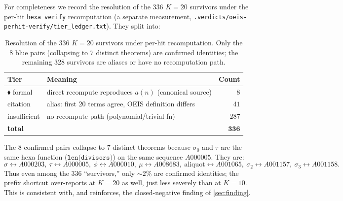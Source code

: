 \documentclass[11pt,a4paper]{article}
\newcommand{\sig}{\sigma}
\newcommand{\Ktwenty}{K\!=\!20}
\theoremstyle{definition}
\begin{document}
For completeness we record the resolution of the $336$ $\Ktwenty$ survivors
under the per-hit \texttt{hexa verify} recomputation (a separate measurement,
\texttt{.verdicts/oeis-perhit-verify/tier\_ledger.txt}). They split into:

\begin{table}[h]
\centering
\caption{Resolution of the $336$ $\Ktwenty$ survivors under per-hit
recomputation. Only the $8$ blue pairs (collapsing to $7$ distinct theorems)
are confirmed identities; the remaining $328$ survivors are aliases or have no
recomputation path.}
\label{tab:survivors}
\begin{tabular}{@{}llr@{}}
\toprule
\textbf{Tier} & \textbf{Meaning} & \textbf{Count}\\
\midrule
$\blacklozenge$ formal & direct recompute reproduces $a(n)$ (canonical source) & $8$\\
citation               & alias: first $20$ terms agree, OEIS definition differs & $41$\\
insufficient           & no recompute path (polynomial/trivial fn)              & $287$\\
\midrule
\textbf{total}         &                                                        & $\mathbf{336}$\\
\bottomrule
\end{tabular}
\end{table}

The $8$ confirmed pairs collapse to $7$ distinct theorems because $\sig_0$ and
$\tau$ are the same hexa function ($\texttt{len(divisors)}$) on the same
sequence $A000005$. They are:
\[
  \sig\!\leftrightarrow\!A000203,\
  \tau\!\leftrightarrow\!A000005,\
  \phi\!\leftrightarrow\!A000010,\
  \mu\!\leftrightarrow\!A008683,\
  \text{aliquot}\!\leftrightarrow\!A001065,\
  \sig_2\!\leftrightarrow\!A001157,\
  \sig_3\!\leftrightarrow\!A001158.
\]
Thus even among the $336$ ``survivors,'' only $\sim\!2\%$ are confirmed
identities; the prefix shortcut over-reports at $K=20$ as well, just less
severely than at $K=10$. This is consistent with, and reinforces, the
closed-negative finding of \textsection\ref{sec:finding}.



\end{document}
